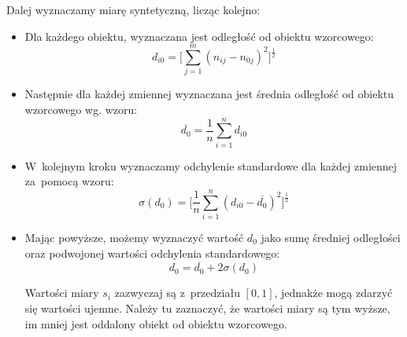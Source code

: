 \documentclass[12pt,a4paper]{report}
\begin{document}
Dalej wyznaczamy miarę syntetyczną, licząc kolejno:
\begin{itemize}
\item Dla każdego obiektu, wyznaczana jest odległość od obiektu wzorcowego:
$$d_{i0}=\bigg[\sum_{j=1}^{m} (n_{ij} - n_{0j})^2 \bigg]^\frac{1}{2}  $$ 
\item Następnie dla każdej zmiennej wyznaczana jest średnia odległość od obiektu wzorcowego wg. wzoru:
$$\overline{d_{0}}=\frac{1}{n}\sum_{i=1}^{n} d_{i0} $$
\item W~kolejnym kroku wyznaczamy odchylenie standardowe dla każdej zmiennej za~pomocą wzoru: 
$$\sigma(d_{0})=\bigg[\frac{1}{n}\sum_{i=1}^{n} (d_{i0}-\overline{d_{0}})^2 \bigg]^\frac{1}{2} $$
\item Mając powyższe, możemy wyznaczyć wartość $d_{0}$ jako sumę średniej odległości oraz podwojonej wartości odchylenia standardowego:
$$d_{0}=\overline{d_{0}} + 2\sigma(d_{0}) $$


Wartości miary $s_{i}$ zazwyczaj są z~przedziału $[0, 1]$, jednakże mogą zdarzyć się wartości ujemne. Należy tu zaznaczyć, że wartości miary są tym wyższe, im mniej jest oddalony obiekt od obiektu wzorcowego. 

\end{itemize}
%
%
\end{document}
